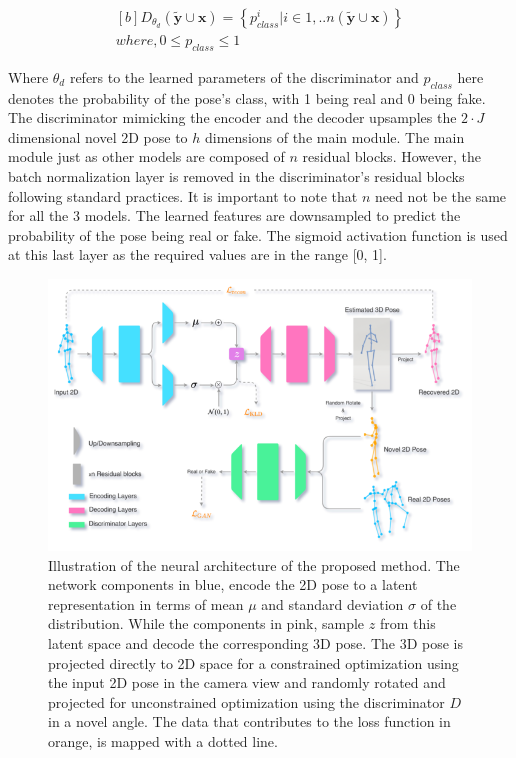 \begin{equation} \label{eqn:discriminator_output}
    \begin{gathered}[b]
        D_{\theta_d}(\tilde{\textbf{y}} \cup \textbf{x}) = \left\lbrace p_{class}^i | i \in {1, .. n(\tilde{\textbf{y}} \cup \textbf{x})}\right\rbrace \\
        where, 0\leq p_{class} \leq 1
    \end{gathered}
\end{equation}

Where $\theta_d$ refers to the learned parameters of the discriminator and $p_{class}$ here denotes the probability of the pose's class, with 1 being real and 0 being fake. The discriminator mimicking the encoder and the decoder upsamples the $2\!\cdot\!J$ dimensional novel 2D pose to $h$ dimensions of the main module. The main module just as other models are composed of $n$ residual blocks. However, the batch normalization layer is removed in the discriminator's residual blocks following standard practices. It is important to note that $n$ need not be the same for all the 3 models. The learned features are downsampled to predict the probability of the pose being real or fake. The sigmoid activation function is used at this last layer as the required values are in the range [0, 1].

\begin{figure}[h] 
    \centering
    \includegraphics[width=\textwidth]{figures/arch/method_arch.png}
    \caption{Illustration of the neural architecture of the proposed method. The network components in blue, encode the 2D pose to a latent representation in terms of mean $\mu$ and standard deviation $\sigma$ of the distribution. While the components in pink, sample $z$ from this latent space and decode the corresponding 3D pose. The 3D pose is projected directly to 2D space for a constrained optimization using the input 2D pose in the camera view and randomly rotated and projected for unconstrained optimization using the discriminator $D$ in a novel angle. The data that contributes to the loss function in orange, is mapped with a dotted line.
    }
    \label{fig:method_arch}
\end{figure}

